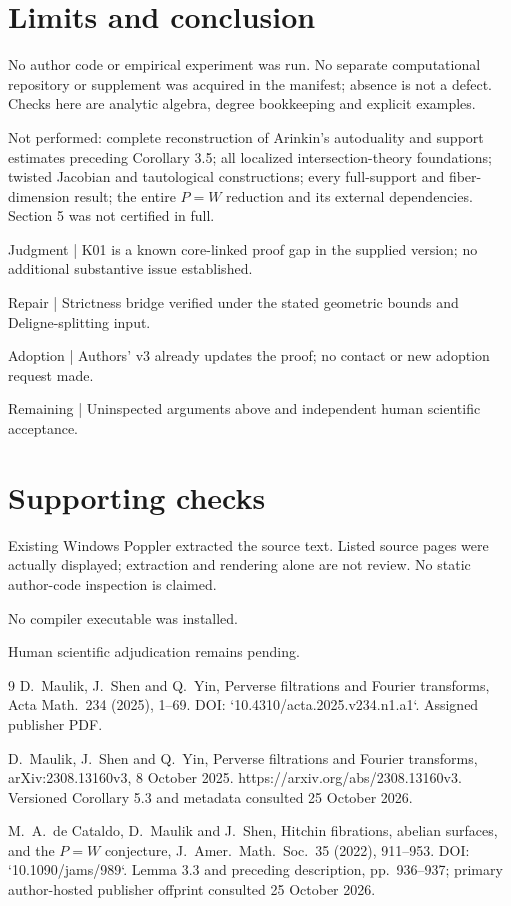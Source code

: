 \documentclass[10pt]{article}
\begin{document}
\section*{Limits and conclusion}
No author code or empirical experiment was run. No separate computational repository or supplement was acquired in the manifest; absence is not a defect. Checks here are analytic algebra, degree bookkeeping and explicit examples.\par
Not performed: complete reconstruction of Arinkin’s autoduality and support estimates preceding Corollary 3.5; all localized intersection-theory foundations; twisted Jacobian and tautological constructions; every full-support and fiber-dimension result; the entire \(P=W\) reduction and its external dependencies. Section 5 was not certified in full.\par
Judgment | K01 is a known core-linked proof gap in the supplied version; no additional substantive issue established.\par
Repair | Strictness bridge verified under the stated geometric bounds and Deligne-splitting input.\par
Adoption | Authors’ v3 already updates the proof; no contact or new adoption request made.\par
Remaining | Uninspected arguments above and independent human scientific acceptance.\par
\section*{Supporting checks}
Existing Windows Poppler extracted the source text. Listed source pages were actually displayed; extraction and rendering alone are not review. No static author-code inspection is claimed.\par
No compiler executable was installed.\par
Human scientific adjudication remains pending.\par
9 D. Maulik, J. Shen and Q. Yin, Perverse filtrations and Fourier transforms, Acta Math. 234 (2025), 1–69. DOI: `10.4310/acta.2025.v234.n1.a1`. Assigned publisher PDF.\par
D. Maulik, J. Shen and Q. Yin, Perverse filtrations and Fourier transforms, arXiv:2308.13160v3, 8 October 2025. https://arxiv.org/abs/2308.13160v3. Versioned Corollary 5.3 and metadata consulted 25 October 2026.\par
M. A. de Cataldo, D. Maulik and J. Shen, Hitchin fibrations, abelian surfaces, and the \(P=W\) conjecture, J. Amer. Math. Soc. 35 (2022), 911–953. DOI: `10.1090/jams/989`. Lemma 3.3 and preceding description, pp. 936–937; primary author-hosted publisher offprint consulted 25 October 2026.\par
\end{document}
